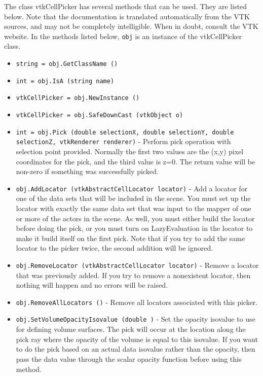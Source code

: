 The class vtkCellPicker has several methods that can be used.
  They are listed below.
Note that the documentation is translated automatically from the VTK sources,
and may not be completely intelligible.  When in doubt, consult the VTK website.
In the methods listed below, \verb|obj| is an instance of the vtkCellPicker class.
\begin{itemize}
\item  \verb|string = obj.GetClassName ()|

\item  \verb|int = obj.IsA (string name)|

\item  \verb|vtkCellPicker = obj.NewInstance ()|

\item  \verb|vtkCellPicker = obj.SafeDownCast (vtkObject o)|

\item  \verb|int = obj.Pick (double selectionX, double selectionY, double selectionZ, vtkRenderer renderer)| -  Perform pick operation with selection point provided. Normally the 
 first two values are the (x,y) pixel coordinates for the pick, and
 the third value is z=0. The return value will be non-zero if
 something was successfully picked.

\item  \verb|obj.AddLocator (vtkAbstractCellLocator locator)| -  Add a locator for one of the data sets that will be included in the
 scene.  You must set up the locator with exactly the same data set
 that was input to the mapper of one or more of the actors in the
 scene.  As well, you must either build the locator before doing the
 pick, or you must turn on LazyEvaluation in the locator to make it
 build itself on the first pick.  Note that if you try to add the
 same locator to the picker twice, the second addition will be ignored.

\item  \verb|obj.RemoveLocator (vtkAbstractCellLocator locator)| -  Remove a locator that was previously added.  If you try to remove a
 nonexistent locator, then nothing will happen and no errors will be
 raised.

\item  \verb|obj.RemoveAllLocators ()| -  Remove all locators associated with this picker.

\item  \verb|obj.SetVolumeOpacityIsovalue (double )| -  Set the opacity isovalue to use for defining volume surfaces.  The
 pick will occur at the location along the pick ray where the 
 opacity of the volume is equal to this isovalue.  If you want to do
 the pick based on an actual data isovalue rather than the opacity,
 then pass the data value through the scalar opacity function before
 using this method.


\end{itemize}
